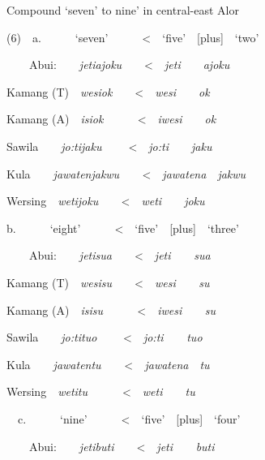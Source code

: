 Compound {\textquoteleft}seven{\textquoteright} to nine{\textquoteright} in central-east Alor

(6)\ \ a.\ \ \ \ \ \ {\textquoteleft}seven{\textquoteright}\ \ \ \ \ \ {\textless}\ \ {\textquoteleft}five{\textquoteright}\ \ [plus]\ \ {\textquoteleft}two{\textquoteright}

\ \ \ \ Abui:\ \ \ \ \textit{jeti}\textit{{\ng}}\textit{ajoku}\ \ \ \ {\textless}\ \ \textit{jeti}\textit{{\ng}}\ \ \ \ \textit{ajoku}

Kamang (T)\ \ \textit{wesi}\textit{{\ng}}\textit{ok}\ \ \ \ {\textless}\ \ \textit{wesi}\textit{{\ng}}\ \ \ \ \textit{ok}

Kamang (A)\ \ \textit{isi{\ng}ok\ \ }\ \ \ \ {\textless}\ \ \textit{iwesi{\ng}}\ \ \ \ \textit{ok}

Sawila\ \ \ \ \textit{jo:ti{\ng}jaku}\textit{ }\textit{\ \ }\ \ {\textless}\ \ \textit{jo:ti{\ng}}\ \ \ \ \textit{jaku}

Kula\ \ \ \ \textit{jawatenjakwu\ \ }\ \ {\textless}\ \ \textit{jawatena}\ \ \textit{jakwu}

Wersing\ \ \textit{weti{\ng}joku\ \ }\ \ {\textless}\ \ \textit{weti{\ng}}\ \ \ \ \textit{joku}

b.\ \ \ \ \ \ {\textquoteleft}eight{\textquoteright}\ \ \ \ \ \ {\textless}\ \ {\textquoteleft}five{\textquoteright}\ \ [plus]\ \ {\textquoteleft}three{\textquoteright}

\ \ \ \ Abui:\ \ \ \ \textit{jeti}\textit{{\ng}}\textit{sua}\ \ \ \ {\textless}\ \ \textit{jeti{\ng}}\textit{\ \ \ \ sua}

Kamang (T)\ \ \textit{wesi{\ng}su}\ \ \ \ {\textless}\ \ \textit{wesi{\ng}\ \ \ \ su}

Kamang (A)\ \ \textit{isi{\ng}su\ \ }\ \ \ \ {\textless}\ \ \textit{iwesi{\ng}\ \ \ \ su}

Sawila\ \ \ \ \textit{jo:ti{\ng}tuo}\textit{ }\ \ \ \ {\textless}\ \ \textit{jo:ti{\ng}\ \ \ \ tuo}

Kula\ \ \ \ \textit{jawatentu\ \ \ \ }{\textless}\textit{\ \ jawatena}\ \ \textit{tu}

Wersing\ \ \textit{weti{\ng}tu\ \ \ \ \ \ }{\textless}\ \ \textit{weti{\ng}}\ \ \ \ \textit{tu}

\ \ c.\ \ \ \ \ \ {\textquoteleft}nine{\textquoteright}\ \ \ \ \ \ {\textless}\ \ {\textquoteleft}five{\textquoteright}\ \ [plus]\ \ {\textquoteleft}four{\textquoteright}

\ \ \ \ Abui:\ \ \ \ \textit{jeti}\textit{{\ng}}\textit{buti}\ \ \ \ {\textless}\ \ \textit{jeti{\ng}}\textit{\ \ \ \ }\textit{buti}

